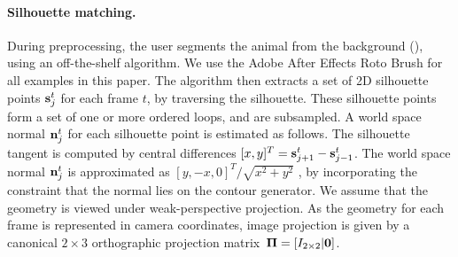\documentclass[preprint]{acmsiggraph}
\begin{document}
\paragraph{Silhouette matching.} 
During preprocessing, the user segments the animal from the
background (), using an off-the-shelf
algorithm. We use the
Adobe After Effects Roto Brush \cite{Bai:2009:VSC} for all examples in
this paper. The algorithm then extracts a set of 2D silhouette points $\mathbf{s}_{j}^t$ for
each frame $t$, by traversing the silhouette. These silhouette points
form a set of one or more ordered loops, and are subsampled. A world
space normal $\mathbf{n}_j^t$ for each silhouette point is estimated as
follows. The silhouette tangent is computed by central differences $[x,y]^T = \mathbf{s}_{j+1}^t -
\mathbf{s}_{j-1}^t$. The world space normal $\mathbf{n}_j^t$ is approximated as
$[y,-x,0]^T/\sqrt{x^2+y^2}$ \cite{Cashman:2012:WSA}, by incorporating the constraint that the normal lies on the contour generator.
We
assume that the geometry is viewed under weak-perspective
projection.  As the
geometry for each frame is represented in camera coordinates, image
projection is given by a canonical $2\times3$ orthographic projection matrix~$\mbox{\boldmath$\Pi$} = [I_{2\times2} | \mathbf{0}]$.
\end{document}
